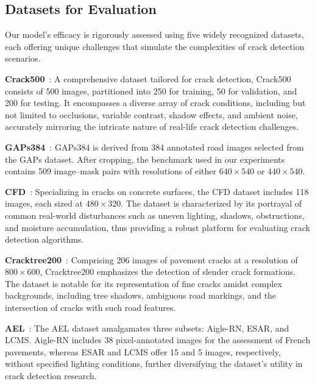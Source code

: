 \documentclass[journal]{IEEEtran}
\begin{document}
\subsection{Datasets for Evaluation}
Our model's efficacy is rigorously assessed using five widely recognized datasets, each offering unique challenges that simulate the complexities of crack detection scenarios.

\textbf{Crack500}~\cite{DBLP:journals/tits/YangZYPML20}: A comprehensive dataset tailored for crack detection, Crack500 consists of 500 images, partitioned into 250 for training, 50 for validation, and 200 for testing. It encompasses a diverse array of crack conditions, including but not limited to occlusions, variable contrast, shadow effects, and ambient noise, accurately mirroring the intricate nature of real-life crack detection challenges.

\textbf{GAPs384}~\cite{DBLP:conf/ijcnn/EisenbachSSADSE17,DBLP:journals/tits/YangZYPML20}: GAPs384 is derived from 384 annotated road images selected from the GAPs dataset. After cropping, the benchmark used in our experiments contains 509 image--mask pairs with resolutions of either $640 \times 540$ or $440 \times 540$.

\textbf{CFD}~\cite{DBLP:journals/tits/ShiCQMC16}: Specializing in cracks on concrete surfaces, the CFD dataset includes 118 images, each sized at $480 \times 320$. The dataset is characterized by its portrayal of common real-world disturbances such as uneven lighting, shadows, obstructions, and moisture accumulation, thus providing a robust platform for evaluating crack detection algorithms.

\textbf{Cracktree200}~\cite{DBLP:journals/prl/ZouCLMW12}: Comprising 206 images of pavement cracks at a resolution of $800 \times 600$, Cracktree200 emphasizes the detection of slender crack formations. The dataset is notable for its representation of fine cracks amidst complex backgrounds, including tree shadows, ambiguous road markings, and the intersection of cracks with such road features.



\textbf{AEL}~\cite{DBLP:journals/tits/AmhazCIB16}: The AEL dataset amalgamates three subsets: Aigle-RN, ESAR, and LCMS. Aigle-RN includes 38 pixel-annotated images for the assessment of French pavements, whereas ESAR and LCMS offer 15 and 5 images, respectively, without specified lighting conditions, further diversifying the dataset's utility in crack detection research.
\end{document}
